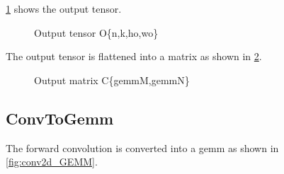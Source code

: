 \Fig \ref{fig:output_tensor} shows the output tensor.

{}
\begin{figure}[!h]
  \centering
  \caption{Output tensor O\{n,k,ho,wo\}}
  \label{fig:output_tensor}
\end{figure}

The output tensor is flattened into a matrix as shown in \Fig \ref{fig:output_matrix_C}.
{}
\begin{figure}[!h]
  \centering
  \caption{Output matrix C\{gemmM,gemmN\}}
  \label{fig:output_matrix_C}
\end{figure}


\subsection{ConvToGemm}

The forward convolution is converted into a gemm as shown in
\Fig \ref{fig:conv2d_GEMM}.

